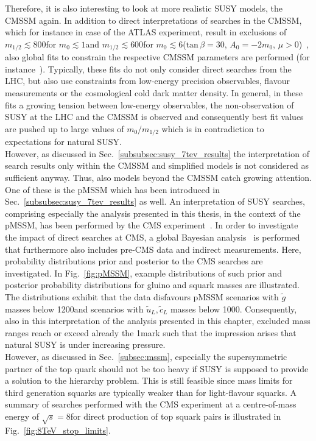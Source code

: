 Therefore, it is also interesting to look at more realistic SUSY models, \eg the CMSSM again. In addition to direct interpretations of searches in the CMSSM, which for instance in case of the ATLAS experiment, result in exclusions of $m_{1/2} \lesssim 800$\gev for $m_{0} \lesssim 1$\tev and $m_{1/2} \lesssim 600$\gev for $m_{0} \lesssim 6$\tev ($\mathrm{tan} \, \beta = 30$, $A_0 = -2m_0$, $\mu >0$)~\cite{bib:ATLAS:PhysicsResultsSUS}, also global fits to constrain the respective CMSSM parameters are performed (\cf for instance~\cite{Bechtle:2012zk, Buchmueller:2013rsa}). Typically, these fits do not only consider direct searches from the LHC, but also use constraints from low-energy precision observables, flavour measurements or the cosmological cold dark matter density. In general, in these fits a growing tension between low-energy observables, the non-observation of SUSY at the LHC and the CMSSM is observed and consequently best fit values are pushed up to large values of $m_0/m_{1/2}$ which is in contradiction to expectations for natural SUSY. \\
However, as discussed in Sec.~\ref{subsubsec:susy_7tev_results} the interpretation of search results only within the CMSSM and simplified models is not considered as sufficient anyway. Thus, also models beyond the CMSSM catch growing attention. One of these is the pMSSM which has been introduced in Sec.~\ref{subsubsec:susy_7tev_results} as well. An interpretation of SUSY searches, comprising especially the analysis presented in this thesis, in the context of the pMSSM, has been performed by the CMS experiment~\cite{CMS-PAS-SUS-13-020}. In order to investigate the impact of direct searches at CMS, a global Bayesian analysis~\cite{robert2001bayesian, o2004bayesian} is performed that furthermore also includes pre-CMS data and indirect measurements. Here, probability distributions prior and posterior to the CMS searches are investigated. In Fig.~\ref{fig:pMSSM}, example distributions of such prior and posterior probability distributions for gluino and squark masses are illustrated. The distributions exhibit that the data disfavours pMSSM scenarios with $\tilde{g}$ masses below 1200\gev and scenarios with $\tilde{u}_L,\tilde{c}_L$ masses below 1000\gev. Consequently, also in this interpretation of the analysis presented in this chapter, excluded mass ranges reach or exceed already the 1\tev mark such that the impression arises that natural SUSY is under increasing pressure. \\
However, as discussed in Sec.~\ref{subsec:mssm}, especially the supersymmetric partner of the top quark should not be too heavy if SUSY is supposed to provide a solution to the hierarchy problem. This is still feasible since mass limits for third generation squarks are typically weaker than for light-flavour squarks. A summary of searches performed with the CMS experiment at a centre-of-mass energy of $\sqrt{s} = 8$\tev for direct production of top squark pairs is illustrated in Fig.~\ref{fig:8TeV_stop_limits}.
